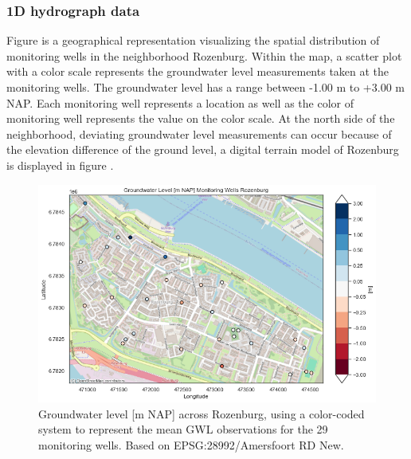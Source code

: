 \subsubsection{1D hydrograph data}
Figure  is a geographical representation visualizing the spatial distribution of monitoring wells in the neighborhood Rozenburg. Within the map, a scatter plot with a color scale represents the groundwater level measurements taken at the monitoring wells. The groundwater level has a range between -1.00 m to +3.00 m NAP. Each monitoring well represents a location as well as the color of monitoring well represents the value on the color scale. At the north side of the neighborhood, deviating groundwater level measurements can occur because of the elevation difference of the ground level, a digital terrain model of Rozenburg is displayed in figure .
\begin{figure}[htbp]
    \centering
    \includegraphics[width=0.75\linewidth]{frontmatter/Rozenburg-fig/gwlroz.png}
    \caption{Groundwater level [m NAP] across Rozenburg, using a color-coded system to represent the mean GWL observations for the 29 monitoring wells. Based on EPSG:28992/Amersfoort RD New.}
    \label{gwlroz}
    
\end{figure}

